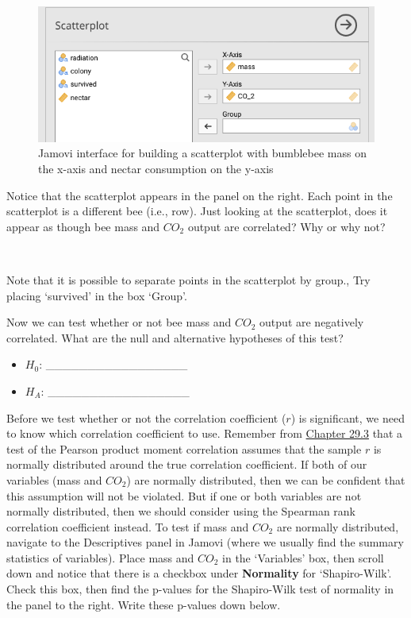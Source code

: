 \documentclass[
]{scrbook}
\begin{document}
\begin{figure}
\includegraphics[width=1\linewidth]{img/jamovi_simple_scatterplot} \caption{Jamovi interface for building a scatterplot with bumblebee mass on the x-axis and nectar consumption on the y-axis}\label{fig:unnamed-chunk-154}
\end{figure}

Notice that the scatterplot appears in the panel on the right.
Each point in the scatterplot is a different bee (i.e., row).
Just looking at the scatterplot, does it appear as though bee mass and \(CO_2\) output are correlated?
Why or why not?

\begin{verbatim}


\end{verbatim}

Note that it is possible to separate points in the scatterplot by group.,
Try placing `survived' in the box `Group'.

Now we can test whether or not bee mass and \(CO_{2}\) output are negatively correlated.
What are the null and alternative hypotheses of this test?

\begin{itemize}
\item
  \(H_{0}\): \_\_\_\_\_\_\_\_\_\_\_\_\_\_\_\_\_
\item
  \(H_{A}\): \_\_\_\_\_\_\_\_\_\_\_\_\_\_\_\_\_
\end{itemize}

Before we test whether or not the correlation coefficient (\(r\)) is significant, we need to know which correlation coefficient to use.
Remember from \protect\hyperlink{correlation-hypothesis-testing}{Chapter 29.3} that a test of the Pearson product moment correlation assumes that the sample \(r\) is normally distributed around the true correlation coefficient.
If both of our variables (mass and \(CO_{2}\)) are normally distributed, then we can be confident that this assumption will not be violated.
But if one or both variables are not normally distributed, then we should consider using the Spearman rank correlation coefficient instead.
To test if mass and \(CO_{2}\) are normally distributed, navigate to the Descriptives panel in Jamovi (where we usually find the summary statistics of variables).
Place mass and \(CO_{2}\) in the `Variables' box, then scroll down and notice that there is a checkbox under \textbf{Normality} for `Shapiro-Wilk'.
Check this box, then find the p-values for the Shapiro-Wilk test of normality in the panel to the right.
Write these p-values down below.
\end{document}
